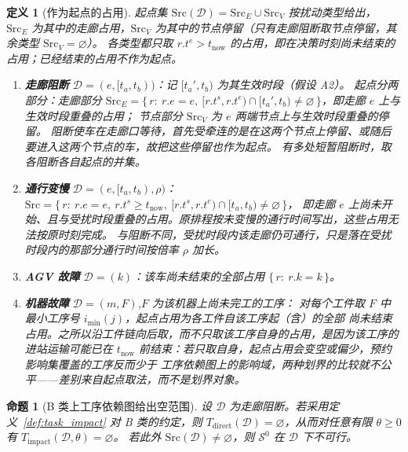 \documentclass[manuscript,screen,review]{acmart}
\newtheorem{definition}{定义}
\newtheorem{prop}{命题}
\begin{document}
\begin{definition}[作为起点的占用]
\label{def:seeds}
起点集 \(\mathrm{Src}(\mathcal{D})=\mathrm{Src}_E\cup\mathrm{Src}_V\) 按扰动类型给出，
\(\mathrm{Src}_E\) 为其中的走廊占用，\(\mathrm{Src}_V\) 为其中的节点停留（只有走廊阻断取节点停留，其余类型 \(\mathrm{Src}_V=\varnothing\)）。
各类型都只取 \(r.t^e>t_{\mathrm{now}}\) 的占用，即在决策时刻尚未结束的占用；已经结束的占用不作为起点。
\begin{enumerate}[label=(\alph*),leftmargin=1.6em,itemsep=0.15em]
\item \textbf{走廊阻断} \(\mathcal{D}=(e,[t_a,t_b))\)：记 \([t_a',t_b)\) 为其生效时段（假设 A2）。
起点分两部分：走廊部分
\(\mathrm{Src}_E=\{\,r:\ r.e=e,\ [r.t^s,r.t^e)\cap[t_a',t_b)\neq\varnothing\,\}\)，即走廊 \(e\) 上与生效时段重叠的占用；
节点部分 \(\mathrm{Src}_V\) 为 \(e\) 两端节点上与生效时段重叠的停留。
阻断使车在走廊口等待，首先受牵连的是在这两个节点上停留、或随后要进入这两个节点的车，故把这些停留也作为起点。
有多处短暂阻断时，取各阻断各自起点的并集。
\item \textbf{通行变慢} \(\mathcal{D}=(e,[t_a,t_b),\rho)\)：
\(\mathrm{Src}=\{\,r:\ r.e=e,\ r.t^s\ge t_{\mathrm{now}},\ [r.t^s,r.t^e)\cap[t_a,t_b)\neq\varnothing\,\}\)，
即走廊 \(e\) 上尚未开始、且与受扰时段重叠的占用。原排程按未变慢的通行时间写出，这些占用无法按原时刻完成。
与阻断不同，受扰时段内该走廊仍可通行，只是落在受扰时段内的那部分通行时间按倍率 \(\rho\) 加长。
\item \textbf{AGV 故障} \(\mathcal{D}=(k)\)：该车尚未结束的全部占用
\(\{\,r:\ r.k=k\,\}\)。
\item \textbf{机器故障} \(\mathcal{D}=(m,F)\),\(F\) 为该机器上尚未完工的工序：
对每个工件取 \(F\) 中最小工序号 \(i_{\min}(j)\)，起点占用为各工件自该工序起（含）的全部
尚未结束占用。之所以沿工件链向后取，而不只取该工序自身的占用，是因为该工序的进站运输可能已在
\(t_{\mathrm{now}}\) 前结束：若只取自身，起点占用会变空或偏少，预约影响集覆盖的工序反而少于
工序依赖图上的影响域，两种划界的比较就不公平——差别来自起点取法，而不是划界对象。
\end{enumerate}
\end{definition}

\begin{prop}[B 类上工序依赖图给出空范围]
\label{prop:miss}
设 \(\mathcal{D}\) 为走廊阻断。若采用定义~\ref{def:task_impact} 对 B 类的约定，则
\(T_{\mathrm{direct}}(\mathcal{D})=\varnothing\)，从而对任意有限 \(\theta\ge 0\) 有
\(T_{\mathrm{impact}}(\mathcal{D},\theta)=\varnothing\)。
若此外 \(\mathrm{Src}(\mathcal{D})\neq\varnothing\)，则 \(\mathcal{S}^0\) 在 \(\mathcal{D}\) 下不可行。
\end{prop}
\end{document}
